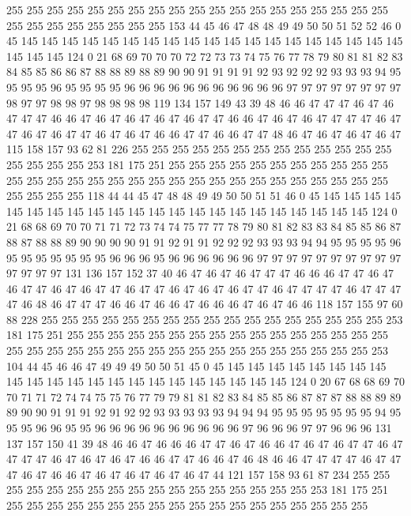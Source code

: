 255 255 255 255 255 255 255 255 255 255 255 255 255 255 255 255 255 255 255 255
255 255 255 255 255 255 255 153 44 45 46 47 48 48 49 49 50 50 51 52
52 46 0 45 145 145 145 145 145 145 145 145 145 145 145 145 145 145 145 145
145 145 145 145 145 145 124 0 21 68 69 70 70 70 72 72 73 73 74 75
76 77 78 79 80 81 81 82 83 84 85 85 86 86 87 88 88 89 88 89
90 90 91 91 91 91 92 93 92 92 92 93 93 93 94 95 95 95 95 96
95 95 95 95 96 96 96 96 96 96 96 96 96 96 96 97 97 97 97 97
97 97 97 98 97 97 98 98 97 98 98 98 98 119 134 157 149 43 39 48
46 46 47 47 47 46 47 46 47 47 47 46 46 47 46 47 46 47 46 47
46 47 47 46 46 47 46 47 46 47 47 47 47 46 47 47 46 47 46 47
47 46 47 46 47 46 46 47 47 46 46 47 47 48 46 47 46 47 46 47
46 47 115 158 157 93 62 81 226 255 255 255 255 255 255 255 255 255 255 255
255 255 255 255 255 255 253 181 175 251 255 255 255 255 255 255 255 255 255 255
255 255 255 255 255 255 255 255 255 255 255 255 255 255 255 255 255 255 255 255
255 255 255 255 118 44 44 45 47 48 48 49 49 50 50 51 51 46 0 45
145 145 145 145 145 145 145 145 145 145 145 145 145 145 145 145 145 145 145 145
145 145 124 0 21 68 68 69 70 70 71 71 72 73 74 74 75 77 77 78
79 80 81 82 83 83 84 85 85 86 87 88 87 88 88 89 90 90 90 90
91 91 92 91 91 92 92 92 93 93 93 94 94 95 95 95 95 96 95 95
95 95 95 95 95 96 96 96 95 96 96 96 96 96 96 97 97 97 97 97
97 97 97 97 97 97 97 97 97 131 136 157 152 37 40 46 47 46 47 46
47 47 47 46 46 46 47 47 46 47 46 47 47 46 47 46 47 47 46 47
47 46 47 46 47 46 47 47 46 47 47 47 47 46 47 47 47 47 46 48
46 47 47 47 46 46 47 46 46 47 46 46 46 47 46 47 46 46 118 157
155 97 60 88 228 255 255 255 255 255 255 255 255 255 255 255 255 255 255 255
255 255 253 181 175 251 255 255 255 255 255 255 255 255 255 255 255 255 255 255
255 255 255 255 255 255 255 255 255 255 255 255 255 255 255 255 255 255 255 255
253 104 44 45 46 46 47 49 49 49 50 50 51 45 0 45 145 145 145 145
145 145 145 145 145 145 145 145 145 145 145 145 145 145 145 145 145 145 124 0
20 67 68 68 69 70 70 71 71 72 74 74 75 75 76 77 79 79 81 81
82 83 84 85 85 86 87 87 87 88 88 89 89 89 90 90 91 91 91 92
91 92 92 93 93 93 93 93 94 94 94 95 95 95 95 95 95 95 94 95
95 95 96 96 95 95 96 96 96 96 96 96 96 96 96 96 97 96 96 96
97 97 96 96 96 131 137 157 150 41 39 48 46 46 47 46 46 46 47 47
46 47 46 46 47 46 47 46 47 47 46 47 47 47 47 46 47 46 47 46
47 46 46 47 47 46 46 47 46 48 46 46 47 47 47 47 46 47 47 47
46 47 46 46 47 46 47 46 47 46 47 46 47 44 121 157 158 93 61 87
234 255 255 255 255 255 255 255 255 255 255 255 255 255 255 255 255 255 253 181
175 251 255 255 255 255 255 255 255 255 255 255 255 255 255 255 255 255 255 255
